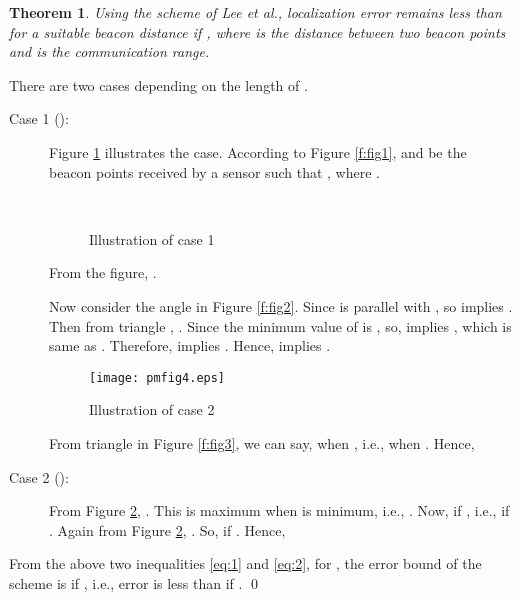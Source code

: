 \documentclass[preprint,11pt]{elsarticle}
\newtheorem{theorem}{Theorem}
\newenvironment{proof}{\noindent{\bf Proof: }}{\qed \smallbreak}
\begin{document}
\begin{theorem}
\label{the1:errbd}
Using the scheme \cite{Lee2009} of Lee et al., localization error remains less than   for a suitable beacon
distance  if , where  is the distance between two beacon points and  is the communication range.
\end{theorem}
\begin{proof}
There are two cases depending on the length of .
\begin{description}
\item[Case 1 ():]
Figure \ref{f:figCase1} illustrates the case.
According to  Figure \ref{f:fig1},  and  be the beacon points received by a sensor such that ,
where .
\begin{figure}[h]
    \centering
    ~~
    ~~
\caption{Illustration of case 1}\label{f:figCase1}
\end{figure}

From the figure, .

Now consider the angle  in Figure \ref{f:fig2}. Since  is parallel
with , so  implies . Then from triangle
, . Since the minimum value of  is ,
so,  implies , which is same as .
Therefore,  implies .
Hence,  implies .
\begin{figure}[h]
\centering
\texttt{[image: pmfig4.eps]}
\caption{Illustration of case 2}\label{f:fig4}
\end{figure}

From triangle  in Figure \ref{f:fig3}, we can say,  when , i.e.,
 when . Hence,

\item[Case 2 ():] From Figure \ref{f:fig4}, . This is maximum when
 is minimum, i.e., . Now,  if , i.e.,
 if . Again from Figure \ref{f:fig4}, . So,  if .
Hence,

\end{description}

From the above two inequalities \ref{eq:1} and \ref{eq:2}, for , the error bound of the scheme \cite{Lee2009}
is  if , i.e., error is less than  if .
\end{proof}
\end{document}
